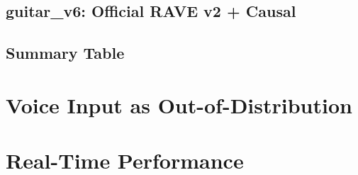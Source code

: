 \subsection{guitar\_v6: Official RAVE v2 + Causal}

\subsection{Summary Table}

\section{Voice Input as Out-of-Distribution}
\label{sec:results_voice_ood}

%
%
%

\section{Real-Time Performance}
\label{sec:results_latency}

